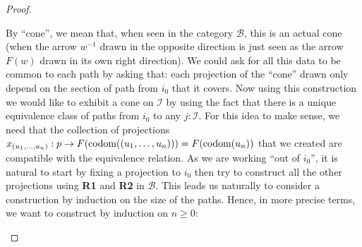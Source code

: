 \documentclass{article}
\numberwithin{equation}{section}
\theoremstyle{definition}
\theoremstyle{plain}
\begin{document}
\begin{proof}
\begin{enumerate}
By ``cone'', we mean that, when seen in the category $\mathcal{B}$, this is an actual cone (when the arrow $w^{-1}$ drawn in the opposite direction is just seen as the arrow $F(w)$ drawn in its own right direction). We could ask for all this data to be common to each path by asking that: each projection of the ``cone'' drawn only depend on the section of path from $i_0$ that it covers. Now using this construction we would like to exhibit a cone on $\mathcal{I}$ by using the fact that there is a unique equivalence class of paths from $i_0$ to any $j:\mathcal{I}$. For this idea to make sense, we need that the collection of projections $x_{(u_1, \dots, u_n)}: p \to F(\textnormal{codom}((u_1, \dots, u_n))) = F(\textnormal{codom}(u_n))$ that we created are compatible with the equivalence relation. As we are working ``out of $i_0$'', it is natural to start by fixing a projection to $i_0$ then try to construct all the other projections using \textbf{R1} and \textbf{R2} in $\mathcal{B}$. This leads us naturally to consider a construction by induction on the size of the paths. Hence, in more precise terms, we want to construct by induction on $n \ge 0$:


\end{enumerate}
\end{proof}
\end{document}
